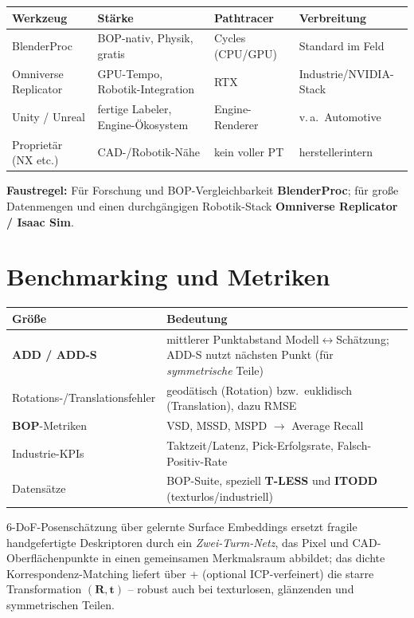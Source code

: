 \begin{longtable}{@{}p{3.0cm}p{4.0cm}p{3.2cm}p{3.4cm}@{}}
\toprule
\textbf{Werkzeug} & \textbf{Stärke} & \textbf{Pathtracer} & \textbf{Verbreitung} \\
\midrule
BlenderProc & BOP-nativ, Physik, gratis & Cycles (CPU/GPU) & Standard im Feld \\
Omniverse Replicator & GPU-Tempo, Robotik-Integration & RTX & Industrie/NVIDIA-Stack \\
Unity / Unreal & fertige Labeler, Engine-Ökosystem & Engine-Renderer & v.\,a.\ Automotive \\
Proprietär (NX etc.) & CAD-/Robotik-Nähe & kein voller PT & herstellerintern \\
\bottomrule
\end{longtable}

\noindent \textbf{Faustregel:} Für Forschung und BOP-Vergleichbarkeit
\textbf{BlenderProc}; für große Datenmengen und einen durchgängigen
Robotik-Stack \textbf{Omniverse Replicator / Isaac Sim}.

\section{Benchmarking und Metriken}
\begin{longtable}{@{}p{3.8cm}p{10.4cm}@{}}
\toprule
\textbf{Größe} & \textbf{Bedeutung} \\
\midrule
\textbf{ADD / ADD-S}     & mittlerer Punktabstand Modell$\leftrightarrow$Schätzung; ADD-S nutzt nächsten Punkt (für \emph{symmetrische} Teile) \\
Rotations-/Translationsfehler & geodätisch (Rotation) bzw.\ euklidisch (Translation), dazu RMSE \\
\textbf{BOP}-Metriken    & VSD, MSSD, MSPD $\rightarrow$ Average Recall \cite{hodan2018bop} \\
Industrie-KPIs           & Taktzeit/Latenz, Pick-Erfolgsrate, Falsch-Positiv-Rate \\
Datensätze               & BOP-Suite, speziell \textbf{T-LESS} und \textbf{ITODD} (texturlos/industriell) \\
\bottomrule
\end{longtable}

\begin{infobox}[title=Kernaussage in einem Satz]
6-DoF-Posenschätzung über gelernte Surface Embeddings ersetzt fragile
handgefertigte Deskriptoren durch ein \emph{Zwei-Turm-Netz}, das Pixel und
CAD-Oberflächenpunkte in einen gemeinsamen Merkmalsraum abbildet; das dichte
Korrespondenz-Matching liefert über + (optional
ICP-verfeinert) die starre Transformation $(\bm{R},\bm{t})$ -- robust auch bei
texturlosen, glänzenden und symmetrischen Teilen.
\end{infobox}
